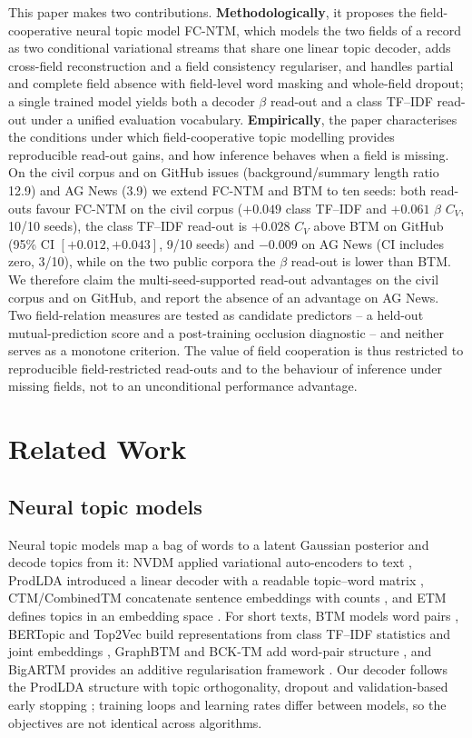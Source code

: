 \documentclass[11pt]{article}
\newcommand{\fcntm}{FC-NTM}
\begin{document}
This paper makes two contributions. \textbf{Methodologically}, it proposes the field-cooperative
neural topic model \fcntm{}, which models the two fields of a record as two conditional variational
streams that share one linear topic decoder, adds cross-field reconstruction and a field
consistency regulariser, and handles partial and complete field absence with field-level word
masking and whole-field dropout; a single trained model yields both a decoder $\beta$ read-out and
a class TF--IDF read-out under a unified evaluation vocabulary. \textbf{Empirically}, the paper characterises the conditions under which field-cooperative topic
modelling provides reproducible read-out gains, and how inference behaves when a field is missing.
On the civil corpus and on GitHub issues (background/summary length ratio 12.9) and AG News (3.9)
we extend \fcntm{} and BTM to ten seeds: both read-outs favour \fcntm{} on the civil corpus
($+0.049$ class TF--IDF and $+0.061$ $\beta$ $C_V$, 10/10 seeds), the class TF--IDF read-out is
$+0.028$ $C_V$ above BTM on GitHub (95\% CI $[+0.012,+0.043]$, 9/10 seeds) and $-0.009$ on AG News
(CI includes zero, 3/10), while on the two public corpora the $\beta$ read-out is lower than BTM.
We therefore claim the multi-seed-supported read-out advantages on the civil corpus and on GitHub,
and report the absence of an advantage on AG News. Two field-relation measures
are tested as candidate predictors -- a held-out mutual-prediction score and a post-training
occlusion diagnostic -- and neither serves as a monotone criterion. The value of field cooperation
is thus restricted to reproducible field-restricted read-outs and to the behaviour of inference
under missing fields, not to an unconditional performance advantage.

\section{Related Work}

\subsection{Neural topic models}

Neural topic models map a bag of words to a latent Gaussian posterior and decode topics from it:
NVDM applied variational auto-encoders to text \cite{miao2016nvdm}, ProdLDA introduced a linear
decoder with a readable topic--word matrix \cite{srivastava2017avitm}, CTM/CombinedTM concatenate
sentence embeddings with counts \cite{bianchi2021ctm}, and ETM defines topics in an embedding space
\cite{dieng2020etm}. For short texts, BTM models word pairs \cite{yan2013btm}, BERTopic and Top2Vec
build representations from class TF--IDF statistics and joint embeddings
\cite{grootendorst2022bertopic,angelov2020top2vec}, GraphBTM and BCK-TM add word-pair structure
\cite{zhu2018graphbtm,zhang2020bcktm}, and BigARTM provides an additive regularisation framework
\cite{vorontsov2015bigartm}. Our decoder follows the ProdLDA structure with topic orthogonality,
dropout \cite{srivastava2014dropout} and validation-based early stopping \cite{prechelt1998early};
training loops and learning rates differ between models, so the objectives are not identical
across algorithms.
\end{document}
